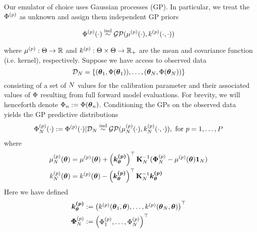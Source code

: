 \documentclass[12pt]{article}
\begin{document}
Our emulator of choice uses Gaussian processes (GP). In particular, we treat the $\Phi^{(p)}$ as unknown and assign them independent GP priors

\[\Phi^{(p)}(\cdot) \overset{\text{ind}}{\sim} \mathcal{GP}(\mu^{(p)}(\cdot), k^{(p)}(\cdot, \cdot))\] 

where $\mu^{(p)}: \Theta \to \mathbb{R}$ and $k^{(p)}: \Theta \times \Theta \to \mathbb{R}_+$ are the mean and covariance function (i.e. kernel), respectively. 
Suppose we have access to observed data 
\[\mathcal{D}_{N} = \left\{(\boldsymbol{\theta}_1, \Phi(\boldsymbol{\theta}_1)), \dots, (\boldsymbol{\theta}_{N}, \Phi(\boldsymbol{\theta}_{N})) \right\}\]
consisting of a set of $N$ values for the calibration parameter and their associated values of $\Phi$ resulting from full forward model evaluations. For brevity, we will henceforth denote 
$\Phi_{n} := \Phi(\boldsymbol{\theta}_{n})$. Conditioning the GPs on the observed data yields the GP predictive distributions
\begin{align} 
\Phi_{N}^{(p)}(\cdot) := \Phi^{(p)}(\cdot)|\mathcal{D}_{N} \overset{\text{ind}}{\sim} \mathcal{GP}(\mu_{N}^{(p)}(\cdot), k_{N}^{(p)}(\cdot, \cdot)), \text{ for } p = 1, \dots, P
\end{align}
where 
\begin{align}
\mu_{N}^{(p)}(\boldsymbol{\theta}) &= \mu^{(p)}(\boldsymbol{\theta}) + \left(\boldsymbol{k^{(p)}_{\boldsymbol{\theta}}}\right)^\top \mathbf{K}_{N}^{-1} (\boldsymbol{\Phi}_{N}^{(p)} - \mu^{(p)}(\boldsymbol{\theta}) \boldsymbol{1}_{N}) \\ 
k_{N}^{(p)}(\boldsymbol{\theta}) &= k^{(p)}(\boldsymbol{\theta}) - \left(\boldsymbol{k^{(p)}_{\boldsymbol{\theta}}}\right)^\top \mathbf{K}_{N}^{-1} \boldsymbol{k^{(p)}_{\boldsymbol{\theta}}}
\end{align}
Here we have defined 
\begin{align}
\boldsymbol{k^{(p)}_{\boldsymbol{\theta}}} &:= \begin{pmatrix} k^{(p)}(\boldsymbol{\theta}_1, \boldsymbol{\theta}), \dots, k^{(p)}(\boldsymbol{\theta}_{N}, \boldsymbol{\theta})  \end{pmatrix}^\top \\ 
\boldsymbol{\Phi}_{N}^{(p)} &:= \begin{pmatrix} \Phi_{1}^{(p)}, \dots, \Phi_{N}^{(p)} \end{pmatrix}^{\top}
\end{align}
\end{document}
